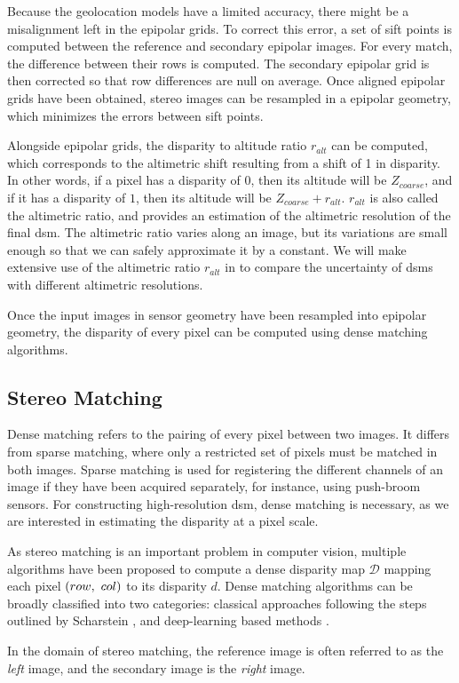 Because the geolocation models have a limited accuracy, there might be a misalignment left in the epipolar grids. To correct this error, a set of \acrfull{sift} points \cite{lowe_distinctive_2004} is computed between the reference and secondary epipolar images. For every match, the difference between their rows is computed. The secondary epipolar grid is then corrected so that row differences are null on average. Once aligned epipolar grids have been obtained, stereo images can be resampled in a epipolar geometry, which minimizes the errors between \acrshort{sift} points.

Alongside epipolar grids, the disparity to altitude ratio $r_{alt}$ can be computed, which corresponds to the altimetric shift resulting from a shift of 1 in disparity. In other words, if a pixel has a disparity of $0$, then its altitude will be $Z_{coarse}$, and if it has a disparity of $1$, then its altitude will be $Z_{coarse}+r_{alt}$. $r_{alt}$ is also called the altimetric ratio, and provides an estimation of the altimetric resolution of the final \acrshort{dsm}. The altimetric ratio varies along an image, but its variations are small enough so that we can safely approximate it by a constant. We will make extensive use of the altimetric ratio $r_{alt}$ in  to compare the uncertainty of \acrshort{dsm}s with different altimetric resolutions.

Once the input images in sensor geometry have been resampled into epipolar geometry, the disparity of every pixel can be computed using dense matching algorithms.

\subsection{Stereo Matching}\label{sec:stereo_matching}
Dense matching refers to the pairing of every pixel between two images. It differs from sparse matching, where only a restricted set of pixels must be matched in both images. Sparse matching is used for registering the different channels of an image if they have been acquired separately, for instance, using push-broom sensors. For constructing high-resolution \acrshort{dsm}, dense matching is necessary, as we are interested in estimating the disparity at a pixel scale.

As stereo matching is an important problem in computer vision, multiple algorithms have been proposed to compute a dense disparity map $\mathcal{D}$ mapping each pixel $(row, ~col)$ to its disparity $d$. Dense matching algorithms can be broadly classified into two categories: classical approaches following the steps outlined by Scharstein \etal \cite{scharstein_taxonomy_2001}, and deep-learning based methods \cite{laga_survey_2022}.
\begin{remark}
	In the domain of stereo matching, the reference image is often referred to as the \textit{left} image, and the secondary image is the \textit{right} image.
\end{remark}

